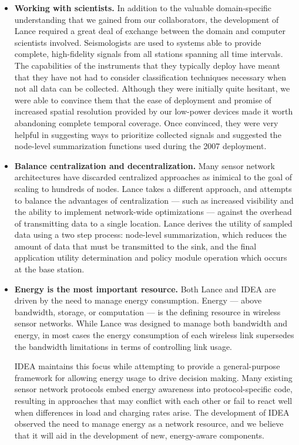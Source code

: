 \begin{itemize}

\item \textbf{Working with scientists.} In addition to the valuable
domain-specific understanding that we gained from our collaborators, the
development of Lance required a great deal of exchange between the domain and
computer scientists involved. Seismologists are used to systems able to
provide complete, high-fidelity signals from all stations spanning all time
intervals. The capabilities of the instruments that they typically deploy
have meant that they have not had to consider classification techniques
necessary when not all data can be collected. Although they were initially
quite hesitant, we were able to convince them that the ease of deployment and
promise of increased spatial resolution provided by our low-power devices
made it worth abandoning complete temporal coverage. Once convinced, they
were very helpful in suggesting ways to prioritize collected signals and
suggested the node-level summarization functions used during the 2007
deployment.

\item \textbf{Balance centralization and decentralization.} Many sensor
network architectures have discarded centralized approaches as inimical to
the goal of scaling to hundreds of nodes. Lance takes a different approach,
and attempts to balance the advantages of centralization --- such as
increased visibility and the ability to implement network-wide optimizations
--- against the overhead of transmitting data to a single location. Lance
derives the utility of sampled data using a two step process: node-level
summarization, which reduces the amount of data that must be transmitted to
the sink, and the final application utility determination and policy module
operation which occurs at the base station.

\item \textbf{Energy is the most important resource.} Both Lance and IDEA
are driven by the need to manage energy consumption. Energy --- above
bandwidth, storage, or computation --- is the defining resource in wireless
sensor networks. While Lance was designed to manage both bandwidth and
energy, in most cases the energy consumption of each wireless link supersedes
the bandwidth limitations in terms of controlling link usage.

IDEA maintains this focus while attempting to provide a general-purpose
framework for allowing energy usage to drive decision making. Many existing
sensor network protocols embed energy awareness into protocol-specific code,
resulting in approaches that may conflict with each other or fail to react
well when differences in load and charging rates arise. The development of
IDEA observed the need to manage energy as a network resource, and we believe
that it will aid in the development of new, energy-aware components.


\end{itemize}
